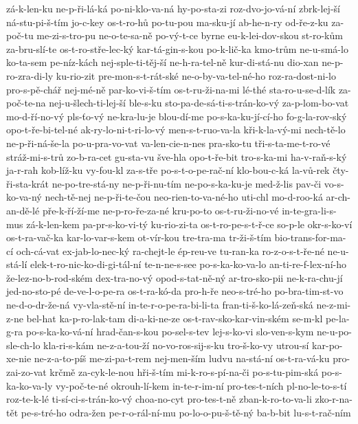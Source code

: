 {zá-k-len-ku
ne-p-ři-lá-ká
po-ni-klo-va-ná
hy-po-sta-zi
roz-dvo-jo-vá-ní
zbrk-lej-ší
ná-stu-pi-š-tím
jo-c-key
os-t-ro-hů
po-tu-pou
ma-sku-jí
ab-he-n-ry
od-ře-z-ku
za-poč-tu
me-zi-s-tro-pu
ne-o-te-sa-ně
po-vý-t-ce
byrne
eu-k-lei-dov-skou
st-ro-kům
za-bru-slí-te
os-t-ro-stře-lec-ký
kar-tá-gin-s-kou
po-k-lič-ka
kmo-trům
ne-u-smá-lo
ko-ta-sem
pe-níz-kách
nej-sple-ti-těj-ší
ne-h-ra-tel-ně
kur-di-stá-nu
dio-xan
ne-p-ro-zra-di-ly
ku-rio-zit
pre-mon-s-t-rát-ské
ne-o-by-va-tel-né-ho
roz-ra-dost-ni-lo
pro-s-pě-chář
nej-mé-ně
par-ko-vi-š-tím
os-t-ru-ži-na-mi
lé-thé
sta-ro-u-se-d-lík
za-poč-te-na
nej-u-šlech-ti-lej-ší
ble-s-ku
sto-pa-de-sá-ti-s-trán-ko-vý
za-p-lom-bo-vat
mo-d-ří-no-vý
pls-ťo-vý
ne-kra-lu-je
blou-dí-me
po-s-ka-ku-jí-cí-ho
fo-g-la-rov-ský
opo-t-ře-bi-tel-né
ak-ry-lo-ni-t-ri-lo-vý
men-s-t-ruo-va-la
kři-k-la-vý-mi
nech-tě-lo
ne-p-ři-ná-še-la
po-u-pra-vo-vat
va-len-cie-n-nes
pra-sko-tu
tři-s-ta-me-t-ro-vé
stráž-mi-s-trů
zo-b-ra-cet
gu-sta-vu
šve-hla
opo-t-ře-bit
tro-s-ka-mi
ha-v-raň-s-ký
ja-r-rah
kob-líž-ku
vy-fou-kl
za-s-tře
po-s-t-o-pe-rač-ní
klo-bou-c-ká
la-vů-rek
čty-ři-sta-krát
ne-po-tre-stá-ny
ne-p-ři-nu-tím
ne-po-s-ka-ku-je
med-ž-lis
pav-či
vo-s-ko-va-ný
nech-tě-nej
ne-p-ři-te-čou
neo-rien-to-va-né-ho
uti-chl
mo-d-roo-ká
ar-ch-an-dě-lé
pře-k-ří-ží-me
ne-p-ro-ře-za-né
kru-po-to
os-t-ru-ži-no-vé
in-te-gra-li-s-mus
zá-k-len-kem
pa-pr-s-ko-vi-tý
ku-rio-zi-ta
os-t-ro-pe-s-t-ř-ce
so-p-le
okr-s-ko-ví
os-t-ra-vač-ka
kar-lo-var-s-kem
ot-vír-kou
tre-tra-ma
tr-ži-š-tím
bio-trans-for-ma-cí
och-cá-vat
ex-jab-lo-nec-ký
ra-chejt-le
ép-reu-ve
tu-ran-ka
ro-z-o-s-t-ře-né
ne-u-stá-lí
elek-t-ro-nic-ko-di-gi-tál-ní
te-n-ne-s-see
po-s-ka-ko-va-lo
an-ti-re-f-lex-ní-ho
že-lez-no-b-rod-ském
dex-tra-no-vý
opod-s-tat-ně-ný
ar-tro-sko-pii
ne-k-ra-chu-jí
jed-no-sto-pé
de-ve-l-o-pe-ra
os-t-ra-kó-da
pro-h-ře
neo-s-tré-ho
po-bra-tim-st-vo
ne-d-o-dr-že-ná
vy-vla-stě-ní
in-te-r-o-pe-ra-bi-li-ta
fran-ti-š-ko-lá-zeň-ská
ne-z-mi-z-ne
bel-hat
ka-p-ro-lak-tam
di-a-ki-ne-ze
os-t-rav-sko-kar-vin-ském
se-m-kl
pe-la-g-ra
po-s-ka-ko-vá-ní
hrad-čan-s-kou
po-sel-s-tev
lej-s-ko-vi
slo-ven-s-kym
ne-u-po-sle-ch-lo
kla-ri-s-kám
ne-z-a-tou-ží
no-vo-ros-sij-s-ku
tro-š-ko-vy
utrou-sí
kar-po-xe-nie
ne-z-a-to-píš
me-zi-pa-t-rem
nej-men-ším
ludvu
na-stá-ní
os-t-ra-vá-ku
pro-zai-zo-vat
krčmě
za-cyk-le-nou
hři-š-tím
mi-k-ro-s-pí-na-či
po-s-tu-pim-ská
po-s-ka-ko-va-ly
vy-poč-te-né
okrouh-lí-kem
in-te-r-im-ní
pro-tes-t-ních
pl-no-le-to-s-tí
roz-te-k-lé
ti-sí-ci-s-trán-ko-vý
choa-no-cyt
pro-tes-t-ně
zban-k-ro-to-va-li
zko-r-na-tět
pe-s-tré-ho
odra-žen
pe-r-o-rál-ní-mu
po-lo-o-pu-š-tě-ný
ba-b-bit
lu-s-t-rač-ním
}
